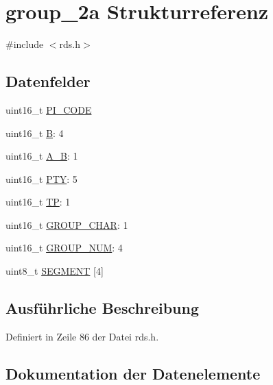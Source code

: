 \hypertarget{structgroup__2a}{}\section{group\+\_\+2a Strukturreferenz}
\label{structgroup__2a}


{\ttfamily \#include $<$rds.\+h$>$}

\subsection*{Datenfelder}
\begin{DoxyCompactItemize}
\item 
uint16\+\_\+t \hyperlink{structgroup__2a_a5cd9b1f6413028425796c1129aa8fd87}{P\+I\+\_\+\+C\+O\+D\+E}
\item 
uint16\+\_\+t \hyperlink{structgroup__2a_ae783bd90764c8455228772c025c064e4}{B}\+: 4
\item 
uint16\+\_\+t \hyperlink{structgroup__2a_a226eb9a4ec1152d0c92ce7324916ad56}{A\+\_\+\+B}\+: 1
\item 
uint16\+\_\+t \hyperlink{structgroup__2a_a0474967478fbbc2c71b800d2e0132d45}{P\+T\+Y}\+: 5
\item 
uint16\+\_\+t \hyperlink{structgroup__2a_ab9e634c63b0d95a96716d5f6d7f06d72}{T\+P}\+: 1
\item 
uint16\+\_\+t \hyperlink{structgroup__2a_a66d4119990dc4c3e040a43885e9bb953}{G\+R\+O\+U\+P\+\_\+\+C\+H\+A\+R}\+: 1
\item 
uint16\+\_\+t \hyperlink{structgroup__2a_a9f692e9f76ee88348d426bcd4e9bc70b}{G\+R\+O\+U\+P\+\_\+\+N\+U\+M}\+: 4
\item 
uint8\+\_\+t \hyperlink{structgroup__2a_a51d200a5620dec8e6cd7a76c63d03ed1}{S\+E\+G\+M\+E\+N\+T} \mbox{[}4\mbox{]}
\end{DoxyCompactItemize}


\subsection{Ausführliche Beschreibung}


Definiert in Zeile 86 der Datei rds.\+h.



\subsection{Dokumentation der Datenelemente}
\hypertarget{structgroup__2a_a226eb9a4ec1152d0c92ce7324916ad56}{}
